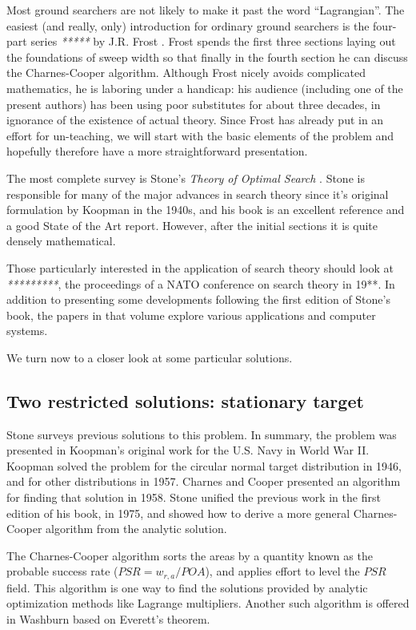 Most ground searchers are not likely to make it past the word
``Lagrangian''. The easiest (and really, only) introduction for
ordinary ground searchers is the four-part series \emph{*****} by
J.R. Frost \cite{}. Frost spends the first three sections laying out
the foundations of sweep width so that finally in the fourth section
he can discuss the Charnes-Cooper algorithm. Although Frost nicely
avoids complicated mathematics, he is laboring under a handicap: his
audience (including one of the present authors) has been using poor
substitutes for about three decades, in ignorance of the existence of
actual theory. Since Frost has already put in an effort for
un-teaching, we will start with the basic elements of the problem and
hopefully therefore have a more straightforward presentation.

The most complete survey is Stone's \emph{Theory of Optimal Search}
\cite{stone89:_optimal}. Stone is responsible for many of the major
advances in search theory since it's original formulation by Koopman
in the 1940s, and his book is an excellent reference and a good State
of the Art report. However, after the initial sections it is quite
densely mathematical. 

Those particularly interested in the application of search theory
should look at \emph{*********}, the proceedings of a NATO conference
on search theory in 19**. In addition to presenting some developments
following the first edition of Stone's book, the papers in that volume
explore various applications and computer systems.


We turn now to a closer look at some particular solutions.

\subsection{Two restricted solutions: stationary target}
\label{sec:previous}

Stone \cite[81]{stone89:_optimal} surveys previous solutions to this
problem. In summary, the problem was presented in Koopman's original
work for the U.S. Navy in World War II. Koopman solved the problem for
the circular normal target distribution in 1946, and for other
distributions in 1957. Charnes and Cooper presented an algorithm for
finding that solution in 1958. Stone unified the previous work in
the first edition of his book, in 1975, and showed how to derive a
more general Charnes-Cooper algorithm from the analytic solution.

The Charnes-Cooper algorithm sorts the areas by a quantity known as
the probable success rate ($PSR = w_{r,a} / POA$), and applies effort
to level the $PSR$ field. This algorithm is one way to find the
solutions provided by analytic optimization methods like Lagrange
multipliers. Another such algorithm is offered in Washburn
\cite{} based on Everett's theorem. 

